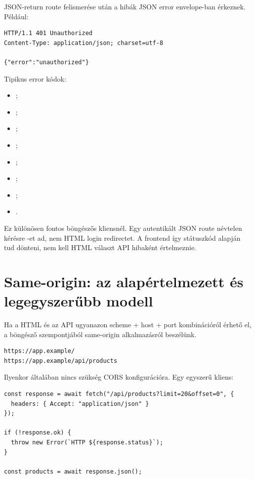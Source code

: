 JSON-return route felismerése után a hibák JSON error envelope-ban érkeznek. Például:

\begin{lstlisting}
HTTP/1.1 401 Unauthorized
Content-Type: application/json; charset=utf-8

{"error":"unauthorized"}
\end{lstlisting}

Tipikus error kódok:

\begin{itemize}
  \item {};
  \item {};
  \item {};
  \item {};
  \item {};
  \item {};
  \item {};
  \item {}.
\end{itemize}

Ez különösen fontos böngészős kliensnél. Egy autentikált JSON route névtelen kérésre -et ad, nem HTML login redirectet. A frontend így státuszkód alapján tud dönteni, nem kell HTML választ API hibaként értelmeznie.

\section{Same-origin: az alapértelmezett és legegyszerűbb modell}

Ha a HTML és az API ugyanazon scheme + host + port kombinációról érhető el, a böngésző szempontjából same-origin alkalmazásról beszélünk.

\begin{lstlisting}
https://app.example/
https://app.example/api/products
\end{lstlisting}

Ilyenkor általában nincs szükség CORS konfigurációra. Egy egyszerű kliens:

\begin{lstlisting}
const response = await fetch("/api/products?limit=20&offset=0", {
  headers: { Accept: "application/json" }
});

if (!response.ok) {
  throw new Error(`HTTP ${response.status}`);
}

const products = await response.json();
\end{lstlisting}

